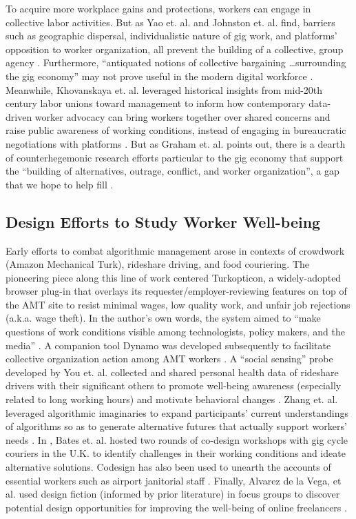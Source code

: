 To acquire more workplace gains and protections, workers can engage in collective labor activities. But as Yao et. al. and Johnston et. al. find, barriers such as geographic dispersal, individualistic nature of gig work, and platforms' opposition to worker organization, all prevent the building of a collective, group agency \cite{atom, organizing}. Furthermore, ``antiquated notions of collective bargaining \dots surrounding the gig economy'' may not prove useful in the modern digital workforce \cite{organizing}. Meanwhile, Khovanskaya et. al. leveraged historical insights from mid-20th century labor unions toward management to inform how contemporary data-driven worker advocacy can bring workers together over shared concerns and raise public awareness of working conditions, instead of engaging in bureaucratic negotiations with platforms \cite{Khovanskaya2019-xo}. But as Graham et. al. points out, there is a dearth of counterhegemonic research efforts particular to the gig economy that support the ``building of alternatives, outrage, conflict, and worker organization'', a gap that we hope to help fill \cite{graham2018towards, outsidetheboss}.

\subsection{Design Efforts to Study Worker Well-being}
Early efforts to combat algorithmic management arose in contexts of crowdwork (Amazon Mechanical Turk), rideshare driving, and food couriering. The pioneering piece along this line of work centered Turkopticon, a widely-adopted browser plug-in that overlays its requester/employer-reviewing features on top of the AMT site to resist minimal wages, low quality work, and unfair job rejections (a.k.a. wage theft). In the author's own words, the system aimed to ``make questions of work conditions visible among technologists, policy makers, and the media'' \cite{irani2013turkopticon}. A companion tool Dynamo was developed subsequently to facilitate collective organization action among AMT workers \cite{salehi2015we}. A ``social sensing'' probe developed by You et. al. collected and shared personal health data of rideshare drivers with their significant others to promote well-being awareness (especially related to long working hours) and motivate behavioral changes \cite{you2021go}. Zhang et. al. leveraged algorithmic imaginaries to expand participants' current understandings of algorithms so as to generate alternative futures that actually support workers' needs \cite{zhang2022algmanagement}. In \cite{bates2021lessons}, Bates et. al. hosted two rounds of co-design workshops with gig cycle couriers in the U.K. to identify challenges in their working conditions and ideate alternative solutions. Codesign has also been used to unearth the accounts of essential workers such as airport janitorial staff \cite{kang2022stories}. Finally, Alvarez de la Vega, et al. used design fiction (informed by prior literature) in focus groups to discover potential design opportunities for improving the well-being of online freelancers \cite{alvarez2022design}.

